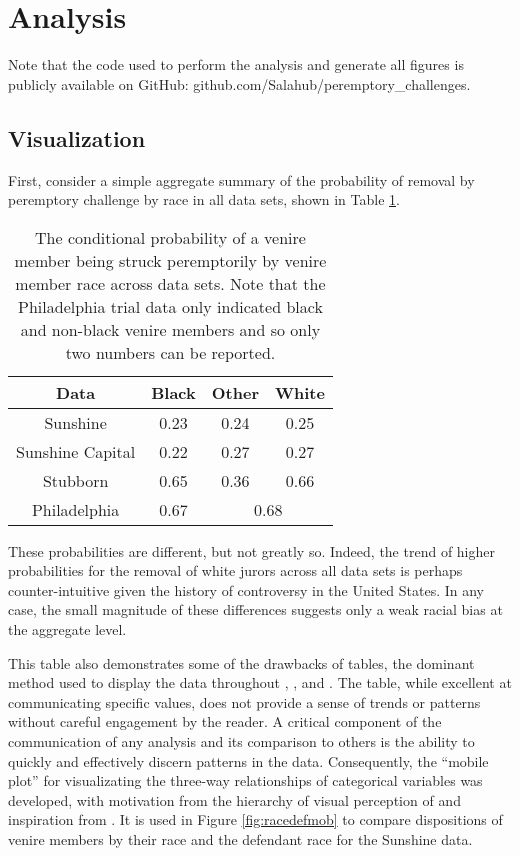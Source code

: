 \section{Analysis} \label{c:analysis}

Note that the code used to perform the analysis and generate all figures is publicly available on GitHub: github.com/Salahub/peremptory\_challenges.

\subsection{Visualization} \label{sec:visual}

First, consider a simple aggregate summary of the probability of removal by peremptory challenge by race in all data sets, shown in Table \ref{tab:margrace}.

\begin{table}[h!]
  \centering
  \caption[Strike Rate by Race]{\footnotesize The conditional probability of a venire member being struck peremptorily by venire member race across data sets. Note that the Philadelphia trial data only
    indicated black and non-black venire members and so only two numbers can be reported.} \label{tab:margrace}
  \begin{tabular}{|c|c c c|} \hline
    Data & Black & Other & White \\ \hline
    Sunshine & 0.23 & 0.24 & 0.25 \\
    Sunshine Capital & 0.22 & 0.27 & 0.27 \\
    Stubborn & 0.65 & 0.36 & 0.66 \\ 
    Philadelphia & 0.67 & \multicolumn{2}{c|}{0.68} \\ \hline
  \end{tabular}
\end{table}

These probabilities are different, but not greatly so. Indeed, the trend of higher probabilities for the removal of white jurors
across all data sets is perhaps counter-intuitive given the history of controversy in the United States. In any case, the small
magnitude of these differences suggests only a weak racial bias at the aggregate level.

This table also demonstrates some of the drawbacks of tables, the dominant method used to display the data throughout
\cite{JurySunshineProj}, \cite{StubbornLegacy}, and \cite{PerempChalMurder}. The table, while excellent at communicating specific
values, does not provide a sense of trends or patterns without careful engagement by the reader. A critical component of the
communication of any analysis and its comparison to others is the ability to quickly and effectively discern patterns in the data. Consequently, the ``mobile plot'' for visualizating the three-way relationships of categorical variables was
developed, with motivation from the hierarchy of visual perception of \cite{cleveland1987} and inspiration from \cite{VisualDisplayQuant}. It is used in Figure \ref{fig:racedefmob} to compare dispositions of venire members by their race and the defendant race for the Sunshine data.

